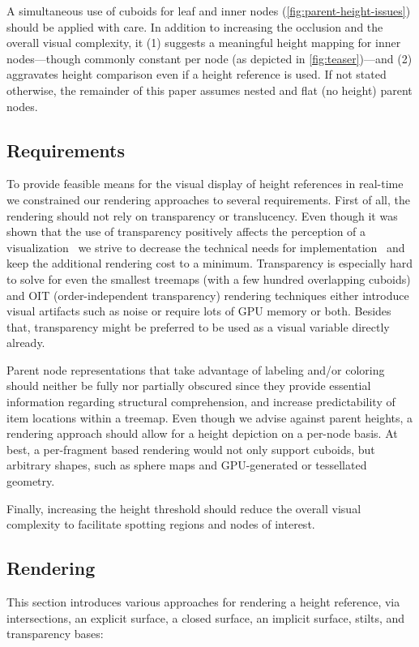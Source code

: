 \documentclass[sigconf]{acmart}
\begin{document}
A simultaneous use of cuboids for leaf and inner nodes (\autoref{fig:parent-height-issues}) should be applied with care.
In addition to increasing the occlusion and the overall visual complexity, it (1) suggests a meaningful height mapping for inner nodes---though commonly constant per node (as depicted in \autoref{fig:teaser})---and (2) aggravates height comparison even if a height reference is used. 
If not stated otherwise, the remainder of this paper assumes nested and flat (no height) parent nodes.

\subsection{Requirements}
To provide feasible means for the visual display of height references in real-time we constrained our rendering approaches to several requirements.
First of all, the rendering should not rely on transparency or translucency.
Even though it was shown that the use of transparency positively affects the perception of a visualization~\cite{jankowski2015interaction} we strive to decrease the technical needs for implementation~\cite{Enderton2011transparency} and keep the additional rendering cost to a minimum.
Transparency is especially hard to solve for even the smallest treemaps (with a few hundred overlapping cuboids) and OIT (order-independent transparency) rendering techniques either introduce visual artifacts such as noise or require lots of GPU memory or both.
Besides that, transparency might be preferred to be used as a visual variable directly already.

Parent node representations that take advantage of labeling and/or coloring should neither be fully nor partially obscured since they provide essential information regarding structural comprehension, and increase predictability of item locations within a treemap.
Even though we advise against parent heights, a rendering approach should allow for a height depiction on a per-node basis.
At best, a per-fragment based rendering would not only support cuboids, but arbitrary shapes, such as sphere maps and GPU-generated or tessellated geometry.

Finally, increasing the height threshold should reduce the overall visual complexity to facilitate spotting regions and nodes of interest.

\subsection{Rendering}
This section introduces various approaches for rendering a height reference, via intersections, an explicit surface, a closed surface, an implicit surface, stilts, and transparency bases:\medskip
\end{document}
